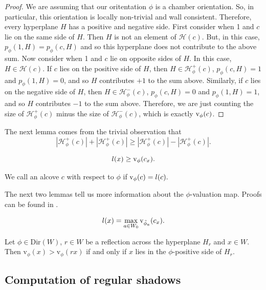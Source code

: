 \documentclass[11pt]{article}
\begin{document}
\begin{proof}
    We are assuming that our oritentation $\phi$ is a chamber orientation. So, in particular, this orientation is locally non-trivial and wall consistent. Therefore, every hyperplane $H$ has a positive and negative side. First consider when 1 and $c$ lie on the same side of $H$. Then $H$ is not an element of $\mathcal{H}(c)$. But, in this case, $p_\phi(1,H)=p_\phi(c,H)$ and so this hyperplane does not contribute to the above sum. 
    Now consider when 1 and $c$ lie on opposite sides of $H$. In this case, $H\in \mathcal{H}(c)$. If $c$ lies on the positive side of $H$, then $H\in\mathcal{H}_{\phi}^+(c)$, $p_\phi(c,H)=1$ and $p_\phi(1,H)=0$, and so $H$ contributes $+1$ to the sum above. Similarly, if $c$ lies on the negative side of $H$, then $H\in\mathcal{H}_{\phi}^-(c)$, $p_\phi(c,H)=0$ and $p_\phi(1,H)=1$, and so $H$ contributes $-1$ to the sum above. Therefore, we are just counting the size of $\mathcal{H}_{\phi}^+(c)$ minus the size of $\mathcal{H}_{\phi}^-(c)$, which is exactly $\textnormal{v}_\phi(c)$. 
\end{proof}


The next lemma comes from the trivial observation that \[|\mathcal{H}_{\phi}^+(c)|+|\mathcal{H}_{\phi}^+(c)|\geq |\mathcal{H}_{\phi}^+(c)|-|\mathcal{H}_{\phi}^+(c)|.\]
\begin{lemma}
    \[l(x)\geq\textnormal{v}_\phi(c_x).\]
\end{lemma}

\begin{definition}
    We call an alcove $c$  with respect to $\phi$ if $\textnormal{v}_\phi(c)=l(c).$
\end{definition}

The next two lemmas tell us more information about the $\phi$-valuation map. Proofs can be found in \cite{SHA}.

\begin{lemma}
    \[l(x)=\max_{a\in W_0}\textnormal{v}_{\tilde{\phi}_a}(c_x).\]
\end{lemma}


\begin{lemma}
    Let $\phi\in$Dir$(W)$, $r\in W$ be a reflection across the hyperplane $H_r$ and $x\in W$. Then v$_\phi(x)>$v$_\phi(rx)$ if and only if $x$ lies in the $\phi$-positive side of $H_r$. 
\end{lemma}


\subsection{Computation of regular shadows}
\end{document}
